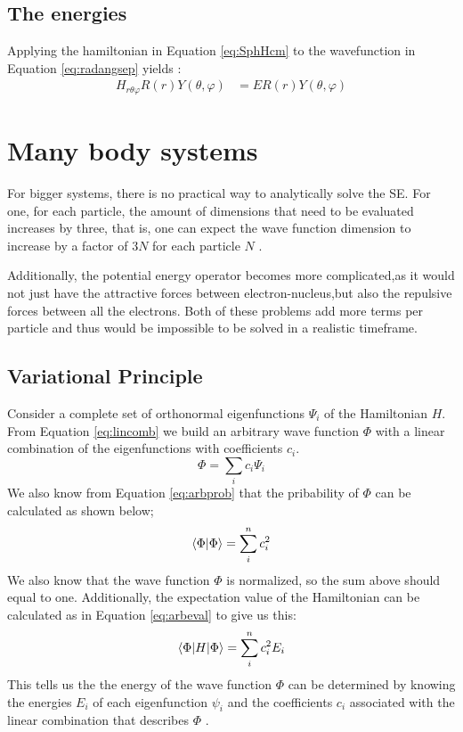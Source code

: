 \documentclass[../master_thesis.tex]{subfiles}
\begin{document}
\subsection{The energies}

Applying the hamiltonian in Equation \ref{eq:SphHcm} to the wavefunction in
Equation \ref{eq:radangsep} yields \cite{Atkins:2014}:
\begin{equation}
  \begin{split}
    H_{r\theta\varphi} R(r)Y(\theta, \varphi) &= E R(r)Y(\theta, \varphi)
  \end{split}
\end{equation}
\section{Many body systems}

For bigger systems, there is no practical way to analytically solve the
\ac{SE}. For one, for each particle, the amount of dimensions that need to be
evaluated increases by three, that is, one can expect the wave function
dimension to increase by a factor of $3N$ for each particle $N$
\cite{Cramer:2004}.

Additionally, the potential energy operator becomes more complicated,as it
would not just have the attractive forces between electron-nucleus,but also the
repulsive forces between all the electrons. Both of these problems add more
terms per particle and thus would be impossible to be solved in a realistic
timeframe. %

\subsection{Variational Principle}

Consider a complete set of orthonormal eigenfunctions $ \Psi_i$  of the
Hamiltonian $H$. From Equation \ref{eq:lincomb} we build an arbitrary
wave function $\Phi$ with a linear combination of the eigenfunctions with
coefficients $c_i$.
\begin{equation}
  \Phi = \sum\limits_ic_i\Psi_i
\end{equation}
We also know from Equation \ref{eq:arbprob} that the pribability of $\Phi$ can
be calculated as shown below;
\begin{equation}
  \braket{\Phi|\Phi} = \sum\limits_i^nc_i^2
\end{equation}
We also know that the wave function $\Phi$ is normalized, so the sum above
should equal to one. Additionally, the expectation value of the Hamiltonian can
be calculated as in Equation \ref{eq:arbeval} to give us this:
\begin{equation}
  \braket{\Phi|H|\Phi} = \sum\limits_i^nc_i^2E_i\label{eq:genenerg}
\end{equation}
This tells us the the energy of the wave function $\Phi$ can be determined by
knowing the energies $E_i$ of each eigenfunction $\psi_i$ and the coefficients
$c_i$ associated with the linear combination that describes $\Phi$
\cite{Cramer:2004}.
\end{document}
